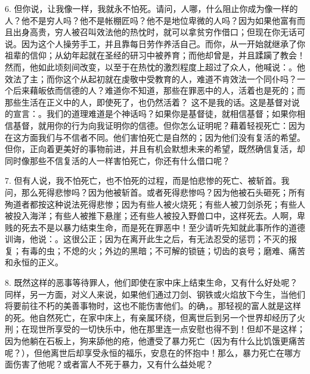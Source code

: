 6. 但你说，让我像一样，我就永不怕死。请问，人哪，什么阻止你成为像一样的人？他不是穷人吗？他不是帐棚匠吗？他不是地位卑微的人吗？因为如果他富有而且出身高贵，穷人被召叫效法他的热忱时，就可以拿贫穷作借口；但现在你无话可说。因为这个人操劳手工，并且靠每日劳作养活自己。而你，从一开始就继承了你祖辈的信仰；从幼年起就在圣经的研习中被养育；而他却曾是，并且蹂躏了教会！然而，他如此顷刻间改变，以至于在热忱的激烈程度上超过了众人，他喊说：。他效法了主；而你这个从起初就在虔敬中受教育的人，难道不肯效法一个同仆吗？一个后来藉皈依而信德的人？难道你不知道，那些在罪恶中的人，活着也是死的；而那些生活在正义中的人，即使死了，也仍然活着？ 这不是我的话。这是基督对说的宣言：。我们的道理难道是个神话吗？如果你是基督徒，就相信基督；如果你相信基督，就用你的行为向我证明你的信德。但你怎么证明呢？藉着轻视死亡：因为在这方面我们与不信者不同。他们害怕死亡是自然的；因为他们没有复活的希望。但你，正向着更美好的事物前进，并且有机会默想未来的希望，既然确信复活，却同时像那些不信复活的人一样害怕死亡，你还有什么借口呢？\par

7. 但有人说，我不怕死亡，也不怕死的过程，而是怕悲惨的死亡、被斩首。我问，那么死得悲惨吗？因为他被斩首。或者死得悲惨吗？因为他被石头砸死；所有殉道者都按这种说法死得悲惨；因为有些人被火烧死；有些人被刀剑杀死；有些人被投入海洋；有些人被推下悬崖；还有些人被投入野兽口中，这样死去。人啊，卑贱的死去不是以暴力结束生命，而是死在罪恶中！至少请听先知就此事所作的道德训诲，他说：。这很公正；因为在离开此生之后，有无法忍受的惩罚；不灭的报复；有毒的虫；不熄的火；外边的黑暗；不可解的锁链；切齿的哀号；磨难、痛苦和永恒的正义。\par

8. 既然这样的恶事等待罪人，他们即使在家中床上结束生命，又有什么好处呢？同样，另一方面，对义人来说，如果他们通过刀剑、钢铁或火焰放下今生，当他们将要前往不朽的美善事物时，这也不能伤害他们。的确，。那轻视的富人就是这样的死。他自然死亡，在家中床上，有亲属环绕，但离世后到另一个世界却经历了火刑；在现世所享受的一切快乐中，他在那里连一点安慰也得不到！但却不是这样；因为他躺在石板上，狗来舔他的疮，他遭受了暴力死亡（因为有什么比饥饿更痛苦呢？），但他离世后却享受永恒的福乐，安息在的怀抱中！那么，暴力死亡在哪方面伤害了他呢？或者富人不死于暴力，又有什么益处呢？\par


